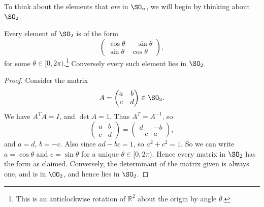 \documentclass[a4paper]{scrartcl}
\begin{document}
To think about the elements that \emph{are} in $\SO_n$, we will begin by thinking about $\SO_2$.

\begin{theorem}[Elements of $\SO_2$]
	Every element of $\SO_2$ is of the form
	$$
	\begin{pmatrix}
		\cos \theta & - \sin \theta \\
		\sin \theta & \cos \theta
	\end{pmatrix},
	$$
	for some $\theta \in [0, 2 \pi)$.\footnote{This is an anticlockwise rotation of $\mathbb{R}^2$ about the origin by angle $\theta$.} Conversely every such element lies in $\SO_2$.
\end{theorem}
\begin{proof}
	Consider the matrix
	$$
A = \begin{pmatrix}
	a & b \\ c & d
\end{pmatrix} \in \SO_2.
	$$
	We have $A^T A = I$, and $\det A = 1$. Thus $A^T = A^{-1}$, so
	$$
	\begin{pmatrix}
		a & b \\ c & d
	\end{pmatrix} = \begin{pmatrix}
		d & -b \\ -c & a
	\end{pmatrix},
	$$
	and $a = d$, $b = -c$. Also since $ad - bc = 1$, so $a^2 + c^2 = 1$. So we can write $a = \cos \theta$ and $c = \sin \theta$ for a unique $\theta \in [0, 2\pi)$. Hence every matrix in $\SO_2$ has the form as claimed. Conversely, the determinant of the matrix given is always one, and is in $\OO_2$, and hence lies in $\SO_2$.
\end{proof}
\end{document}
